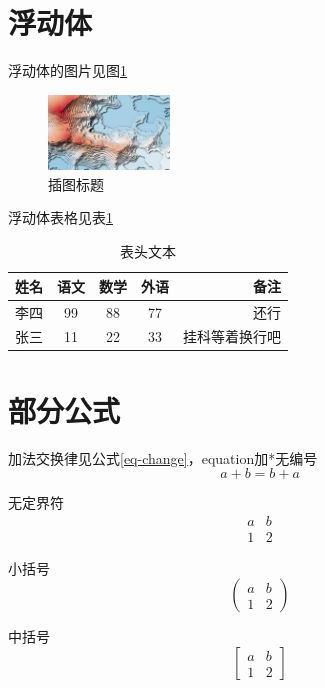 \documentclass{ctexart}
\begin{document}
	\newpage
	\section{浮动体}
	浮动体的图片见图\ref{fig-dem}%
	\begin{figure}[htbp]
		\centering
		\includegraphics[height=2cm]{test.png}
		\caption{插图标题}\label{fig-dem}
	\end{figure}

	浮动体表格见表\ref{tab-score}
	\begin{table}[htbp]
			\centering
			\caption{表头文本}\label{tab-score}
			\begin{tabular}{l||c c c|r}
			\hline \hline
			姓名 & 语文 & 数学 & 外语 & 备注 \\
			\hline
			李四 & 99 & 88 & 77 & 还行 \\
			张三 & 11 & 22 & 33 & 挂科等着换行吧 \\
			\hline
			\end{tabular}
	\end{table}

	\newpage
	\section{部分公式}
	加法交换律见公式\ref{eq-change}，equation加*无编号
	\begin{equation}
		a+b=b+a \label{eq-change}
	\end{equation}
	
	无定界符
	\[
	\begin{matrix}
		a & b \\
		1 & 2
	\end{matrix}
	\]
	
	小括号
	\[
	\begin{pmatrix}
		a & b \\
		1 & 2
	\end{pmatrix}
	\]
	
	中括号
	\[
	\begin{bmatrix}
		a & b \\
		1 & 2
	\end{bmatrix}
	\]
	
\end{document}
